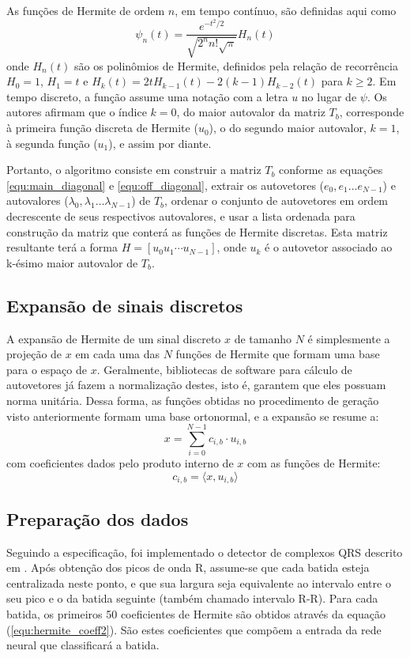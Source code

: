 As funções de Hermite de ordem $n$, em tempo contínuo, são definidas aqui como
\begin{equation} \label{equ:hermite_func2}
    \psi_n(t) = \frac{e^{-t^2/2}}{\sqrt{2^nn!\sqrt{\pi}}}H_n(t)
\end{equation}
onde $H_n(t)$ são os polinômios de Hermite, definidos pela relação de recorrência $H_0 = 1$, $H_1 = t$ e $H_k(t)=2tH_{k-1}(t)-2(k-1)H_{k-2}(t)$ para $k \geq 2$. Em tempo discreto, a função assume uma notação com a letra $u$ no lugar de $\psi$. Os autores afirmam que o índice $k=0$, do maior autovalor da matriz $T_b$, corresponde à primeira função discreta de Hermite ($u_0$), o do segundo maior autovalor, $k=1$, à segunda função ($u_1$), e assim por diante. 

Portanto, o algoritmo consiste em construir a matriz $T_b$ conforme as equações \ref{equ:main_diagonal} e \ref{equ:off_diagonal}, extrair os autovetores ($e_0, e_1 \ldots e_{N-1}$) e autovalores ($\lambda_0, \lambda_1 \ldots \lambda_{N-1}$) de $T_b$, ordenar o conjunto de autovetores em ordem decrescente de seus respectivos autovalores, e usar a lista ordenada para construção da matriz que conterá as funções de Hermite discretas. Esta matriz resultante terá a forma $H = [u_0 u_1 \cdots u_{N-1}]$, onde $u_k$ é o autovetor associado ao k-ésimo maior autovalor de $T_b$. 

\subsection{Expansão de sinais discretos}
A expansão de Hermite de um sinal discreto $x$ de tamanho $N$ é simplesmente a projeção de $x$ em cada uma das $N$ funções de Hermite que formam uma base para o espaço de $x$. Geralmente, bibliotecas de software para cálculo de autovetores já fazem a normalização destes, isto é, garantem que eles possuam norma unitária. Dessa forma, as funções obtidas no procedimento de geração visto anteriormente formam uma base ortonormal, e a expansão se resume a:
\begin{equation} \label{equ:hermite_exp2}
    x = \sum_{i=0}^{N-1} c_{i,b}\cdot u_{i,b}
\end{equation}
com coeficientes dados pelo produto interno de $x$ com as funções de Hermite:
\begin{equation} \label{equ:hermite_coeff2}
    c_{i,b} = \langle x,u_{i,b} \rangle
\end{equation}

\subsection{Preparação dos dados}
Seguindo a especificação, foi implementado o detector de complexos QRS descrito em \cite{Tompkins85}. Após obtenção dos picos de onda R, assume-se que cada batida esteja centralizada neste ponto, e que sua largura seja equivalente ao intervalo entre o seu pico e o da batida seguinte (também chamado intervalo R-R). Para cada batida, os primeiros 50 coeficientes de Hermite são obtidos através da equação (\ref{equ:hermite_coeff2}). São estes coeficientes que compõem a entrada da rede neural que classificará a batida.

